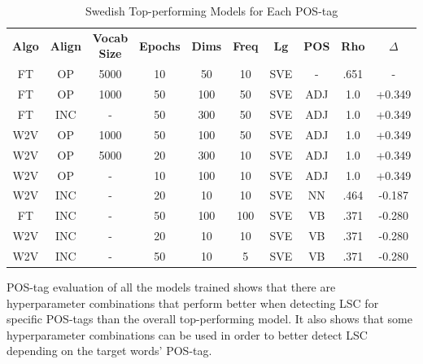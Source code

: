 \begin{table}[h]
\centering
\begin{tabular}{cccccccccc} 
\toprule
\textbf{ Algo } & \textbf{ Align } & \textbf{ Vocab Size } & \textbf{ Epochs } & \textbf{ Dims } & \textbf{ Freq } & \textbf{ Lg } & \textbf{ POS } & \textbf{ Rho } & \textbf{ $\Delta$ }  \\
FT              & OP               & 5000                  & 10                & 50              & 10                        & SVE           & -              & .651           & -               \\
FT              & OP               & 1000                  & 50                & 100             & 50                        & SVE           & ADJ            & 1.0            & +0.349          \\
FT              & INC              & -                     & 50                & 300             & 50                        & SVE           & ADJ            & 1.0            & +0.349          \\
W2V             & OP               & 1000                  & 50                & 100             & 50                        & SVE           & ADJ            & 1.0            & +0.349          \\
W2V             & OP               & 5000                  & 20                & 300             & 10                        & SVE           & ADJ            & 1.0            & +0.349          \\
W2V             & OP               & -                     & 10                & 100             & 10                        & SVE           & ADJ            & 1.0            & +0.349          \\
W2V             & INC              & -                     & 20                & 10              & 10                        & SVE           & NN             & .464           & -0.187          \\
FT              & INC              & -                     & 50                & 100             & 100                       & SVE           & VB             & .371           & -0.280          \\
W2V             & INC              & -                     & 20                & 10              & 10                        & SVE           & VB             & .371           & -0.280          \\
W2V             & INC              & -                     & 50                & 10              & 5                         & SVE           & VB             & .371           & -0.280          \\
\bottomrule
\end{tabular}
\caption{Swedish Top-performing Models for Each POS-tag}
\label{tab:sve-posresults}
\end{table}

\bigskip
\bigskip
\bigskip
\bigskip
POS-tag evaluation of all the models trained shows that there are hyperparameter combinations that perform better when detecting LSC for specific POS-tags than the overall top-performing model. It also shows that some hyperparameter combinations can be used in order to better detect LSC depending on the target words’ POS-tag. 

